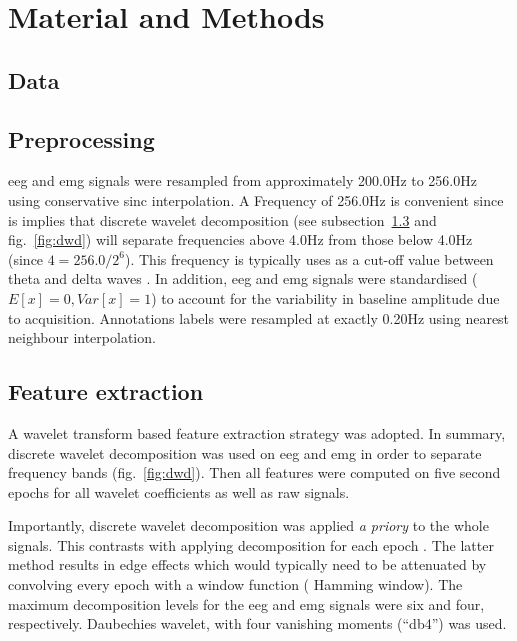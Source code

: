 \section{Material and Methods} \label{matmet}

\subsection{Data}

\subsection{Preprocessing}

\gls{eeg} and \gls{emg} signals were resampled from approximately 200.0Hz to 256.0Hz using
conservative sinc interpolation.
A Frequency of 256.0Hz is convenient since is implies that discrete wavelet decomposition (see subsection~\ref{sub:features} and fig.~\ref{fig:dwd}) will separate
frequencies above 4.0Hz from those below 4.0Hz (since $4 = 256.0/{2^6} $).
This frequency is typically uses as a cut-off value between theta and delta waves \citationneeded{}.
In addition, \gls{eeg} and \gls{emg} signals were standardised ($E[x] = 0, Var[x] = 1$) to account for the variability in baseline amplitude due to acquisition.
Annotations labels were resampled at exactly 0.20Hz using nearest neighbour interpolation.

\subsection{Feature extraction}
\label{sub:features}

A wavelet transform based feature extraction strategy was adopted.
In summary, discrete wavelet decomposition was used on \gls{eeg} and \gls{emg}
in order to separate frequency bands (fig.~\ref{fig:dwd}).
Then all features were computed on five second epochs for all wavelet coefficients as well as raw signals.



Importantly, discrete wavelet decomposition was applied \emph{a priory} to the whole signals.
This contrasts with applying decomposition for each epoch \citationneeded{}.
The latter method results in edge effects which would typically need to be attenuated by convolving every epoch with a window function (\eg{} Hamming window).
The maximum decomposition levels for the \gls{eeg} and \gls{emg} signals were six and four, respectively.
Daubechies wavelet, with four vanishing moments (``db4'') was used.

